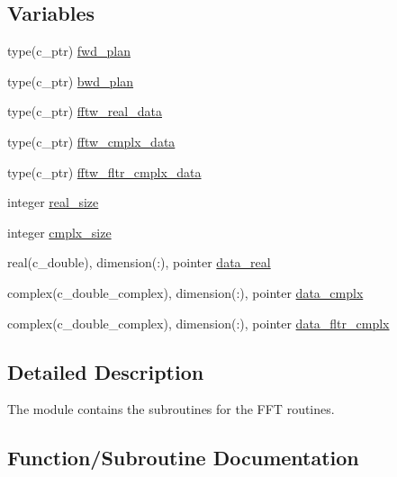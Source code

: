 \subsection*{Variables}
\begin{DoxyCompactItemize}
\item 
type(c\+\_\+ptr) \hyperlink{namespacem__fftw_af605e2137e55bfc3b5e95bbdad51803a}{fwd\+\_\+plan}
\item 
type(c\+\_\+ptr) \hyperlink{namespacem__fftw_a5120d0924ad190de0c0967cfdfdffb64}{bwd\+\_\+plan}
\item 
type(c\+\_\+ptr) \hyperlink{namespacem__fftw_a0db6f31d6d28b16d18982654bd98501a}{fftw\+\_\+real\+\_\+data}
\item 
type(c\+\_\+ptr) \hyperlink{namespacem__fftw_a5ec1a65aeb900c5fc0c437c04a15bb1c}{fftw\+\_\+cmplx\+\_\+data}
\item 
type(c\+\_\+ptr) \hyperlink{namespacem__fftw_acf83109d9518ac141074223356bc9385}{fftw\+\_\+fltr\+\_\+cmplx\+\_\+data}
\item 
integer \hyperlink{namespacem__fftw_a7963f79188a7191b7d8436707e2aa4a5}{real\+\_\+size}
\item 
integer \hyperlink{namespacem__fftw_afa99ee82497ae0ee316e97734ad0d7d3}{cmplx\+\_\+size}
\item 
real(c\+\_\+double), dimension(\+:), pointer \hyperlink{namespacem__fftw_a5fc31000de6fec8b2dc1a9a1259f8089}{data\+\_\+real}
\item 
complex(c\+\_\+double\+\_\+complex), dimension(\+:), pointer \hyperlink{namespacem__fftw_a46b5b6c6849f50f0fe5f96301520e981}{data\+\_\+cmplx}
\item 
complex(c\+\_\+double\+\_\+complex), dimension(\+:), pointer \hyperlink{namespacem__fftw_a2baa49912c2585f5937bcb41804edc3a}{data\+\_\+fltr\+\_\+cmplx}
\end{DoxyCompactItemize}


\subsection{Detailed Description}
The module contains the subroutines for the F\+FT routines. 

\subsection{Function/\+Subroutine Documentation}
\mbox{\label{namespacem__fftw_a23c9c885c472ef518a89306f78dab97c}} 
